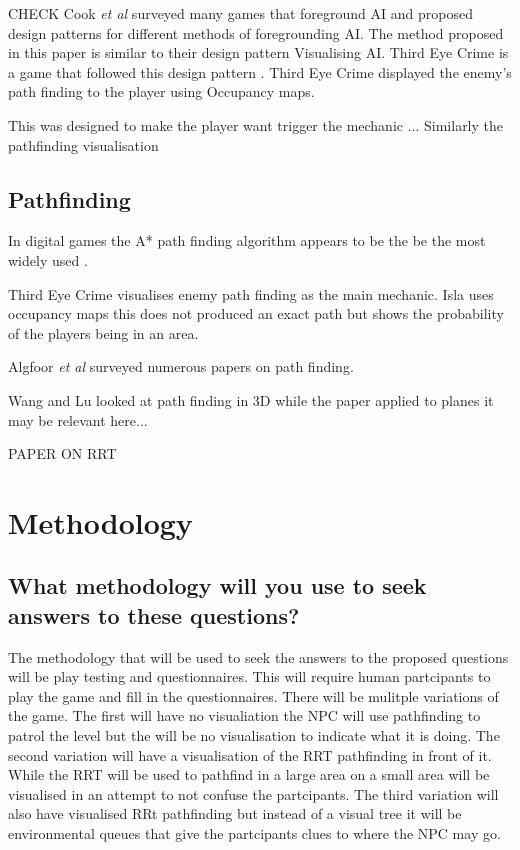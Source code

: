 \documentclass[journal]{IEEEtran}
\begin{document}
CHECK Cook \textit{et al} surveyed many games that foreground AI and proposed design patterns for different methods of foregrounding AI.  The method proposed in this paper is similar to their design pattern Visualising AI.  
Third Eye Crime is a game that followed this design pattern \cite{Isla2014}.  Third Eye Crime displayed the enemy's path finding to the player using Occupancy maps. 
 
This was designed to make the player want trigger the mechanic ...  Similarly the pathfinding visualisation  


\subsection{Pathfinding}
In digital games the A* path finding algorithm appears to be the be the most widely used \cite{Algfoor2015}. 

Third Eye Crime \cite{Isla2014} visualises enemy path finding as the main mechanic. Isla uses occupancy maps this does not produced an exact path but shows the probability of the players being in an area. 

Algfoor \textit{et al} surveyed numerous papers on path finding. 

Wang and Lu looked at path finding in 3D while the paper applied to planes it may be relevant here... \cite{wang2012}

PAPER ON RRT



\section{Methodology}
\subsection{What methodology will you use to seek answers to these questions?}
The methodology that will be used to seek the answers to the proposed questions will be play testing and questionnaires. This will require human partcipants to play the game and fill in the questionnaires. There will be mulitple variations of the game. The first will have no visualiation the NPC will use pathfinding to patrol the level but the will be no visualisation to indicate what it is doing.  The second variation will have a visualisation of the RRT pathfinding in front of it. While the RRT will be used to pathfind in a large area on a small area will be visualised in an attempt to not confuse the partcipants. The third variation will also have visualised RRt pathfinding but instead of a visual tree it will be environmental queues that give the partcipants clues to where the NPC may go.
\end{document}
